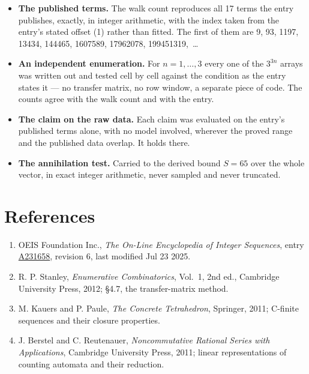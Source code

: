 \documentclass[11pt]{article}
\theoremstyle{definition}
\begin{document}
\begin{itemize}

\item {\bfseries The published terms.} The walk count reproduces all 17 terms the entry publishes, exactly, in integer arithmetic, with the index taken from the entry's stated offset (1) rather than fitted. The first of them are 9, 93, 1197, 13434, 144465, 1607589, 17962078, 199451319,~\dots

\item {\bfseries An independent enumeration.} For $n = 1,\dots,3$ every one of the $3^{3n}$ arrays was written out and tested cell by cell against the condition as the entry states it --- no transfer matrix, no row window, a separate piece of code. The counts agree with the walk count and with the entry.

\item {\bfseries The claim on the raw data.} Each claim was evaluated on the entry's published terms alone, with no model involved, wherever the proved range and the published data overlap. It holds there.

\item {\bfseries The annihilation test.} Carried to the derived bound $S = 65$ over the whole vector, in exact integer arithmetic, never sampled and never truncated.

\end{itemize}

\section{References}

\begin{enumerate}

\item OEIS Foundation Inc., \emph{The On-Line Encyclopedia of Integer Sequences}, entry \href{https://oeis.org/A231658}{A231658}, revision 6, last modified Jul 23 2025.

\item R. P. Stanley, \emph{Enumerative Combinatorics}, Vol.~1, 2nd ed., Cambridge University Press, 2012; \S4.7, the transfer-matrix method.

\item M. Kauers and P. Paule, \emph{The Concrete Tetrahedron}, Springer, 2011; C-finite sequences and their closure properties.

\item J. Berstel and C. Reutenauer, \emph{Noncommutative Rational Series with Applications}, Cambridge University Press, 2011; linear representations of counting automata and their reduction.

\end{enumerate}
\end{document}
